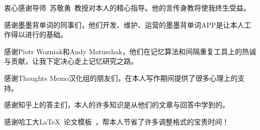 \begin{acknowledgements}
衷心感谢导师~苏敬勇~教授对本人的精心指导。他的言传身教将使我终生受益。

感谢墨墨背单词的同事们，他们开发、维护、运营的墨墨背单词APP是让本人工作得以进行的基础。

感谢Piotr Wozniak和Andy Matuschak，他们在记忆算法和间隔重复工具上的热诚与贡献，让我下定决心走上记忆研究之路。

感谢Thoughts Memo汉化组的朋友们，在本人写作期间提供了很多心理上的支持。

感谢知乎上的答主们，本人的许多知识是从他们的文章与回答中学到的。

感谢哈工大\LaTeX\ 论文模板\hithesis\ ，帮本人节省了许多调整格式的宝贵时间！

\end{acknowledgements}
